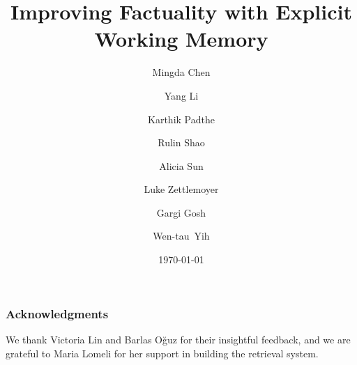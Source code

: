 \documentclass[]{fairmeta}
\title{Improving Factuality with Explicit Working Memory}
\author[]{Mingda Chen}
\author[]{Yang Li}
\author[]{Karthik Padthe}
\author[]{Rulin Shao}
\author[]{Alicia Sun}
\author[]{Luke Zettlemoyer}
\author[]{Gargi Gosh}
\author[]{Wen-tau~Yih}
\affiliation[]{Meta FAIR}
\date{\today}
\begin{document}
\maketitle








\subsubsection*{Acknowledgments}
We thank Victoria Lin and Barlas O\u{g}uz for their insightful feedback, and we are grateful to Maria Lomeli for her support in building the retrieval system.


\clearpage
\newpage


\end{document}
